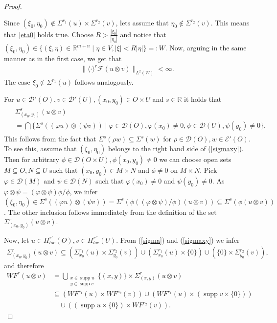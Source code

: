\documentclass[10pt,a4paper]{amsart}
\newcommand{\supp}{\operatorname{supp}}
\begin{document}
\begin{proof}
\begin{enumerate}
Since $(\xi_0, \eta_0)\notin \Sigma^{r_1} (u) \times \Sigma^{r_2} (v)$, lets assume that $\eta_0 \notin \Sigma^{r_2} (v)$. This means that \eqref{eta0} holds true. Choose $R>\frac{|\xi_0|}{|\eta_0|}$ and notice that $(\xi_0 , \eta_0) \in \{ (\xi , \eta)\in \mathbb{R}^{m+n} \mid \eta\in V , |\xi| < R |\eta | \} =: W$. Now, arguing in the same manner as in the first case, we get that
\begin{align*}
\lVert \langle \cdot\rangle^{r} \mathcal{F} (u\otimes v) \rVert_{L^2 (W)} < \infty.
\end{align*}
The case $\xi_0 \notin \Sigma^{r_1} (u)$ follows analogously.
\end{enumerate}
For $u\in \mathcal{D}' (O), v\in \mathcal{D}' (U), (x_0 , y_0) \in O\times U$ and $s\in\mathbb{R}$ it holds that
\begin{align}
\label{sigmaxy}
\begin{split}
&\Sigma_{(x_0 , y_0)} ^s (u\otimes v)\\
&= \bigcap \{ \Sigma^s ( (\varphi u) \otimes (\psi v) ) \mid \varphi \in \mathcal{D} (O) , \varphi (x_0) \neq 0 , \psi\in\mathcal{D} (U) , \psi (y_0) \neq 0\}.
\end{split}
\end{align}
This follows from the fact that $\Sigma^s (\rho w) \subseteq \Sigma^s (w)$ for $\rho \in \mathcal{D} (O) , w \in \mathcal{E}' (O)$. To see this, assume that $(\xi_0 , \eta_0)$ belongs to the right hand side of (\ref{sigmaxy}). Then for arbitrary $\phi\in\mathcal{D} (O\times U) , \phi (x_0 , y_0) \neq 0$ we can choose open sets $M\subseteq O , N\subseteq U$ such that $(x_0,y_0)\in M\times N$ and $\phi \neq 0$ on $M\times N$. Pick $\varphi\in \mathcal{D} (M)$ and $\psi\in\mathcal{D}(N)$ such that $\varphi (x_0) \neq 0$ and $\psi (y_0) \neq 0$. As $\varphi \otimes \psi = (\varphi \otimes \psi)\phi/\phi$, we infer $(\xi_0 , \eta_0) \in \Sigma^s ((\varphi u) \otimes (\psi v)) = \Sigma^s (\phi ((\varphi \otimes \psi)/\phi) (u\otimes v)) \subseteq \Sigma^s (\phi (u\otimes v)) $. The other inclusion follows immediately from the definition of the set $\Sigma_{(x_0 , y_0)} ^s (u\otimes v)$.

Now, let $u\in H_{loc} ^{r'} (O), v\in H_{loc} ^{r''} (U)$. From (\ref{sigma}) and (\ref{sigmaxy}) we infer
\begin{align*}
\Sigma_{(x_0 , y_0)} ^r (u\otimes v)
\subseteq (\Sigma_{x_0 } ^{r_1} (u) \times \Sigma_{y_0 } ^{r_2} (v)) \cup (\Sigma_{x_0 } ^{r_1} (u) \times \{0 \}) \cup ( \{0 \} \times \Sigma_{y_0 } ^{r_2} (v)),
\end{align*}
and therefore
\begin{align*}
WF^r (u\otimes v)
&= \bigcup_{\substack{ x\in\supp u \\ y\in \supp v }} \{(x,y)\} \times \Sigma_{(x,y)} ^r (u\otimes v)\\
&\subseteq (WF^{r_1} (u) \times WF^{r_2} (v)) \cup (WF^{r_1} (u) \times (\supp v \times \{0\}))\\
&\quad \cup ((\supp u \times \{0 \}) \times WF^{r_2} (v)).
\end{align*}
\end{proof}
\end{document}
